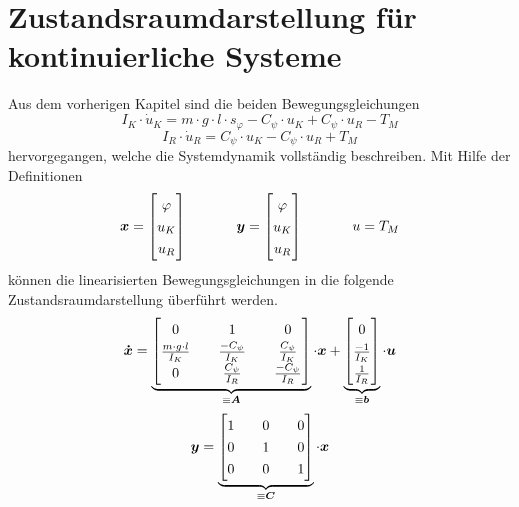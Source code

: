 \section{Zustandsraumdarstellung für kontinuierliche Systeme}
Aus dem vorherigen Kapitel sind die beiden Bewegungsgleichungen 
\begin{equation}
I_K \cdot \dot{u}_K = m\cdot g\cdot l\cdot s_{\varphi} - C_{\psi}\cdot u_{K} + C_{\psi} \cdot u_{R} - T_M
\end{equation}
\begin{equation}
I_R\cdot \dot{u}_R = C_{\psi}\cdot u_{K} - C_{\psi}\cdot u_{R} + T_M
\end{equation}
hervorgegangen, welche die Systemdynamik vollständig beschreiben. Mit Hilfe der Definitionen
\begin{equation}
\bs{x} = \begin{bmatrix} \varphi \\ u_K \\ u_R \end{bmatrix}
\hspace{35pt}
\bs{y} = \begin{bmatrix} \varphi \\ u_K \\ u_R \end{bmatrix}
\hspace{35pt}
u = T_M
\end{equation}
können die linearisierten Bewegungsgleichungen in die folgende Zustandsraumdarstellung überführt werden.
\begin{equation}
\renewcommand*{\arraystretch}{1.3}
\bs{\dot{x}} = \underbrace{\begin{bmatrix}
0 && 1 && 0 
\\ 
\frac{m\cdot g\cdot l}{I_K} && \frac{-C_{\psi}}{I_K} && \frac{C_{\psi}}{I_K}
\\ 
0 && \frac{C_{\psi}}{I_R} && \frac{-C_{\psi}}{I_R}
\end{bmatrix}}_{\equiv \bs{A}} \cdot \bs{x}
+
\underbrace{\begin{bmatrix}
0 \\ \frac{-1}{I_K} \\ \frac{1}{I_R}
\end{bmatrix}}_{\equiv \bs{b}} \cdot \bs{u}
\end{equation}
\begin{equation}
\bs{y} = \underbrace{\begin{bmatrix}
1 && 0 && 0 \\ 0 && 1 && 0 \\ 0 && 0 && 1
\end{bmatrix}}_{\equiv \bs{C}} \cdot \bs{x}
\end{equation}
